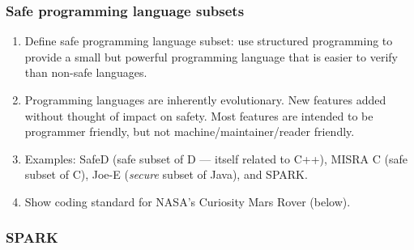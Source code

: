 \documentclass[11pt]{article}
\begin{document}
\subsubsection*{Safe programming language subsets}

\begin{enumerate}

  \item Define safe programming language subset:  use structured programming to provide a small but powerful programming language that is easier to verify than non-safe languages.

  \item Programming languages are inherently evolutionary. New features added without thought of impact on safety. Most features are intended to be programmer friendly, but not machine/maintainer/reader friendly.

  \item Examples: SafeD (safe subset of D --- itself related to C++), MISRA C (safe subset of C), Joe-E (\emph{secure} subset of Java), and SPARK.

  \item Show coding standard for NASA's Curiosity Mars Rover (below).

\end{enumerate}

\subsubsection*{SPARK}
\end{document}
